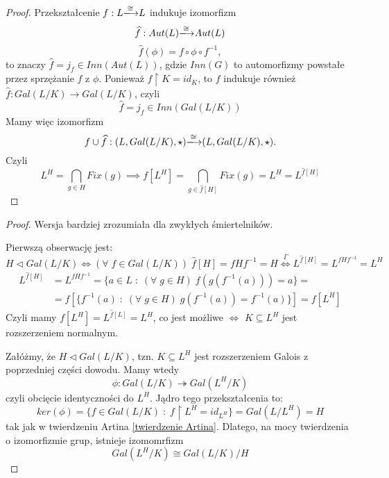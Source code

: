 \begin{proof}
Przekształcenie $f:L\isomorphism L$ indukuje izomorfizm
$$\hat{f}:Aut(L)\isomorphism Aut(L)$$
$$\hat{f}(\phi)=f\circ\phi\circ f^{-1},$$
to znaczy $\hat{f}=j_f\in Inn(Aut(L))$, gdzie $Inn(G)$ to automorfizmy powstałe przez sprzężanie $f$ z $\phi$. Ponieważ $f\restriction K=id_K$, to $f$ indukuje również $\hat{f}:Gal(L/K)\to Gal(L/K)$, czyli
$$\hat{f}=j_f\in Inn(Gal(L/K))$$
Mamy więc izomorfizm
$$f\cup\hat{f}:(L, Gal(L/K), \star)\isomorphism (L ,Gal(L/K), \star).$$
Czyli
$$L^H=\bigcap_{g\in H} Fix(g)\implies f[L^H]=\bigcap_{g\in \hat{f}[H]}Fix(g)=L^H=L^{\hat{f}[H]}$$

\end{proof}

\begin{proof} Wersja bardziej zrozumiała dla zwykłych śmiertelników.
  
  Pierwszą obserwację jest:
  $$H\triangleleft Gal(L/K)\iff(\forall\;f\in Gal(L/K))\;\hat{f}[H]=fHf^{-1}=H\overset{\Gamma}{\iff} L^{\hat{f}[H]}=L^{fHf^{-1}}=L^H$$%
  \begin{align*}
    L^{\hat{f}[H]}&=L^{fHf^{-1}}=\{a\in L\;:\;(\forall\;g\in H)\;f(g(f^{-1}(a)))=a\}=\\
                  &=f[\{f^{-1}(a)\;:\;(\forall\;g\in H)\;g(f^{-1}(a))=f^{-1}(a)\}]=f[L^H]
  \end{align*}
  Czyli mamy $f[L^H]=L^{\hat{f}[L]}=L^H$, co jest możliwe $\iff$ $K\subseteq L^H$ jest rozszerzeniem normalnym.

  Załóżmy, że $H\triangleleft Gal(L/K)$, tzn. $K\subseteq L^H$ jest rozszerzeniem Galois z poprzedniej części dowodu. Mamy wtedy
  $$\phi:Gal(L/K)\twoheadrightarrow Gal(L^H/K)$$
  czyli obcięcie identyczności do $L^H$. Jądro tego przekształcenia to:
  $$ker(\phi)=\{f\in Gal(L/K)\;:\;f\restriction L^H=id_{L^H}\}=Gal(L/L^H)=H$$
  tak jak w twierdzeniu Artina \ref{twierdzenie Artina}. Dlatego, na mocy twierdzenia o izomorfizmie grup, istnieje izomomrfizm
  $$Gal(L^H/K)\cong Gal(L/K)/H$$
\end{proof}


